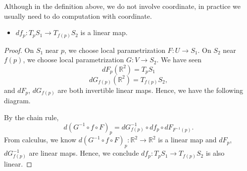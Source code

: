 \begin{remark}
    Although in the definition above, we do not involve coordinate,
    in practice we usually need to do computation with coordinate.
\end{remark}
\begin{itemize}
    \item \(df_p\colon T_p S_1\to T_{f(p)}S_2\) is a linear map.
\end{itemize}
\begin{proof}
    On \(S_1\) near \(p\), we choose local parametrization 
\(F\colon U\to S_1\). On \(S_2\) near \(f(p)\), we choose local 
parametrization \(G\colon V\to S_2\). We have seen 
\[
    dF_p\left(\mathbb{R}^2\right)=T_p S_1    
\] 
\[
    dG_{f(p)}\left(\mathbb{R}^2\right)=T_{f(p)} S_2
,\]
and \(dF_p\), \(dG_{f(p)}\) are both invertible linear maps. Hence,
we have the following diagram.
\begin{center}
\end{center}
By the chain rule,
\[
    d\left(G^{-1}\circ f\circ F\right)_p=dG^{-1}_{f(p)}
    \circ df_p\circ dF_{F^{-1}(p)}.
\]
From calculus, we know 
\(d\left(G^{-1}\circ f\circ F\right)_p\colon\mathbb{R}^2
\to\mathbb{R}^2\)
is a linear map and \(dF_p\), \(dG^{-1}_{f(p)}\) are linear maps.
Hence, we conclude \(df_p\colon T_p S_1\to T_{f(p)}S_2\) is also linear.
\end{proof}
